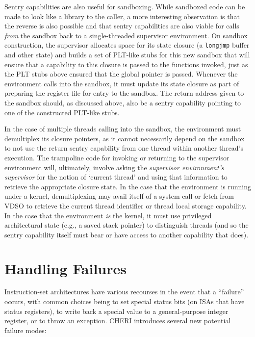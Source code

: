 Sentry capabilities are also useful for sandboxing.  While sandboxed code can
be made to look like a library to the caller, a more
interesting observation is that the reverse is also possible and that sentry
capabilities are also viable for calls \emph{from} the sandbox back to a
single-threaded supervisor environment.  On sandbox construction, the
supervisor allocates space for its state closure (a \texttt{longjmp} buffer
and other state) and builds a set of PLT-like stubs for this
new sandbox that will ensure that a capability to this closure is passed to
the functions invoked, just as the PLT stubs above ensured that the global
pointer is passed.  Whenever the environment calls into the sandbox, it must
update its state closure as part of preparing the register file for entry to
the sandbox.  The return address given to the sandbox should, as discussed
above, also be a sentry capability pointing to one of the constructed
PLT-like stubs.

In the case of multiple threads calling into the sandbox, the environment must
demultiplex its closure pointers, as it cannot necessarily depend on the
sandbox to not use the return sentry capability from one thread within another
thread's execution.  The trampoline code for invoking or returning to the
supervisor environment will, ultimately, involve asking the \emph{supervisor environment's
supervisor} for the notion of `current thread' and using that information to
retrieve the appropriate closure state.  In the case that the environment is
running under a kernel, demultiplexing may avail itself of a system call or
fetch from VDSO to retrieve the current thread identifier or thread local
storage capability.  In the case that the environment \emph{is} the kernel, it
must use privileged architectural state (e.g., a saved stack pointer) to
distinguish threads (and so the sentry capability itself must bear
\cappermASR or have access to another capability that does).



\section{Handling Failures}

Instruction-set architectures have various recourses in the event that a
``failure'' occurs, with common choices being to set special status bits (on
ISAs that have status registers), to write back a special value to a
general-purpose integer register, or to throw an exception.
CHERI introduces several new potential failure modes:

